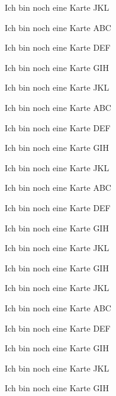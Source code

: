 \documentclass[a9paper,8pt,print,grid=both,flip]{kartei}
\begin{document}
	\begin{karte}{Ich bin noch eine Karte}
		JKL
	\end{karte}
	\begin{karte}{Ich bin noch eine Karte}
		ABC
	\end{karte}
	\begin{karte}{Ich bin noch eine Karte}
		DEF
	\end{karte}
	\begin{karte}{Ich bin noch eine Karte}
		GIH
	\end{karte}
	\begin{karte}{Ich bin noch eine Karte}
		JKL
	\end{karte}
	\begin{karte}{Ich bin noch eine Karte}
		ABC
	\end{karte}
	\begin{karte}{Ich bin noch eine Karte}
		DEF
	\end{karte}
	\begin{karte}{Ich bin noch eine Karte}
		GIH
	\end{karte}
	\begin{karte}{Ich bin noch eine Karte}
		JKL
	\end{karte}
	\begin{karte}{Ich bin noch eine Karte}
		ABC
	\end{karte}
	\begin{karte}{Ich bin noch eine Karte}
		DEF
	\end{karte}
	\begin{karte}{Ich bin noch eine Karte}
		GIH
	\end{karte}
	\begin{karte}{Ich bin noch eine Karte}
		JKL
	\end{karte}	\begin{karte}{Ich bin noch eine Karte}
			GIH
		\end{karte}
		\begin{karte}{Ich bin noch eine Karte}
			JKL
		\end{karte}
		\begin{karte}{Ich bin noch eine Karte}
			ABC
		\end{karte}
		\begin{karte}{Ich bin noch eine Karte}
			DEF
		\end{karte}
		\begin{karte}{Ich bin noch eine Karte}
			GIH
		\end{karte}
		\begin{karte}{Ich bin noch eine Karte}
			JKL
		\end{karte}	\begin{karte}{Ich bin noch eine Karte}
				GIH
			\end{karte}
\end{document}
